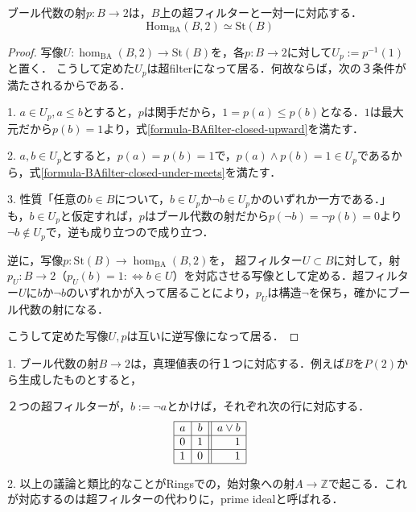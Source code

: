 \documentclass[uplatex, 12pt, dvipdfmx]{jsarticle}
\begin{document}
\begin{proposition*}
    ブール代数の射$p:B\to 2$は，$B$上の超フィルターと一対一に対応する．
    \[ \mathrm{Hom}_{\mathrm{BA}}(B,2)\simeq \mathrm{St}(B) \]
\end{proposition*}
\begin{proof}
    写像$U:\hom_{\mathrm{BA}}(B,2)\to \mathrm{St}(B)$を，各$p:B\to 2$に対して$U_p:=p^{-1}(1)$と置く．
    こうして定めた$U_p$は超filterになって居る．何故ならば，次の３条件が満たされるからである．
    
    1. $a\in U_p,a\le b$とすると，$p$は関手だから，$1=p(a)\le p(b)$となる．$1$は最大元だから$p(b)=1$より，式\ref{formula-BAfilter-closed-upward}を満たす．
    
    2. $a,b\in U_p$とすると，$p(a)=p(b)=1$で，$p(a)\land p(b) = 1\in U_p$であるから，式\ref{formula-BAfilter-closed-under-meets}を満たす．

    3. 性質「任意の$b\in B$について，$b\in U_p$か$\lnot b\in U_p$かのいずれか一方である．」も，$b\in U_p$と仮定すれば，$p$はブール代数の射だから$p(\lnot b)=\lnot p(b)=0$より$\lnot b\notin U_p$で，逆も成り立つので成り立つ．

    逆に，写像$p:\mathrm{St}(B)\to\hom_{\mathrm{BA}}(B,2)$を，
    超フィルター$U\subset B$に対して，射$p_U:B\to 2$（$p_U(b)=1:\Leftrightarrow b\in U$）を対応させる写像として定める．超フィルター$U$に$b$か$\lnot b$のいずれかが入って居ることにより，$p_U$は構造$\lnot$を保ち，確かにブール代数の射になる．

    こうして定めた写像$U,p$は互いに逆写像になって居る．
\end{proof}
\vspace{3cm}
\begin{remark*}
    1. ブール代数の射$B\to 2$は，真理値表の行１つに対応する．例えば$B$を$P(2)$から生成したものとすると，
    \begin{center}
    \end{center}
    
    ２つの超フィルターが，$b:=\lnot a$とかけば，それぞれ次の行に対応する．
    \[\begin{array}{|l|c||r|}\hline
            a & b & a\lor b  \\ \hline
            0 & 1 & 1  \\\hline
            1 & 0 & 1  \\ \hline
    \end{array}\]

    \vspace{1cm}
    2. 以上の議論と類比的なことがRingsでの，始対象への射$A\to\mathbb{Z}$で起こる．これが対応するのは超フィルターの代わりに，prime idealと呼ばれる．
\end{remark*}
\vspace{1cm}
\end{document}
